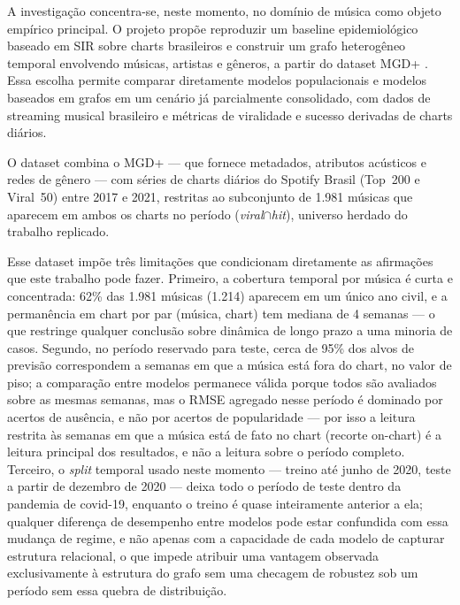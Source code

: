 A investigação concentra-se, neste momento, no domínio de música como objeto empírico principal. O projeto propõe reproduzir um baseline epidemiológico baseado em SIR sobre charts brasileiros e construir um grafo heterogêneo temporal envolvendo músicas, artistas e gêneros, a partir do dataset MGD+ \citep{seufitelli2023dsw}. Essa escolha permite comparar diretamente modelos populacionais e modelos baseados em grafos em um cenário já parcialmente consolidado, com dados de streaming musical brasileiro e métricas de viralidade e sucesso derivadas de charts diários.

O dataset combina o MGD+ \citep{seufitelli2023dsw} — que fornece metadados, atributos acústicos e redes de gênero — com séries de charts diários do Spotify Brasil (Top~200 e Viral~50) entre 2017 e 2021, restritas ao subconjunto de 1.981 músicas que aparecem em ambos os charts no período (\emph{viral}$\cap$\emph{hit}), universo herdado do trabalho replicado.

Esse dataset impõe três limitações que condicionam diretamente as afirmações que este trabalho pode fazer. Primeiro, a cobertura temporal por música é curta e concentrada: 62\% das 1.981 músicas (1.214) aparecem em um único ano civil, e a permanência em chart por par (música, chart) tem mediana de 4 semanas — o que restringe qualquer conclusão sobre dinâmica de longo prazo a uma minoria de casos. Segundo, no período reservado para teste, cerca de 95\% dos alvos de previsão correspondem a semanas em que a música está fora do chart, no valor de piso; a comparação entre modelos permanece válida porque todos são avaliados sobre as mesmas semanas, mas o RMSE agregado nesse período é dominado por acertos de ausência, e não por acertos de popularidade — por isso a leitura restrita às semanas em que a música está de fato no chart (recorte on-chart) é a leitura principal dos resultados, e não a leitura sobre o período completo. Terceiro, o \emph{split} temporal usado neste momento — treino até junho de 2020, teste a partir de dezembro de 2020 — deixa todo o período de teste dentro da pandemia de covid-19, enquanto o treino é quase inteiramente anterior a ela; qualquer diferença de desempenho entre modelos pode estar confundida com essa mudança de regime, e não apenas com a capacidade de cada modelo de capturar estrutura relacional, o que impede atribuir uma vantagem observada exclusivamente à estrutura do grafo sem uma checagem de robustez sob um período sem essa quebra de distribuição.

